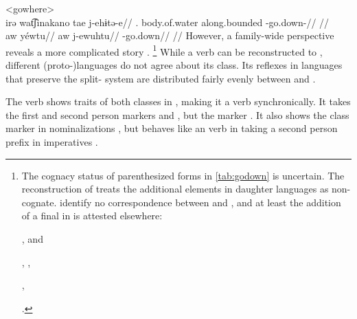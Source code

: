\pex<gowhere>
 \carijo {}\\
\begingl
\gla irə wat͡ʃinakano tae j-ehɨtə-e//
\glb {}. body.of.water along.bounded -go.down-//
\glft {}//
\endgl
{} \yukpa \parencite[][]{meira2003primeras}\\
\begingl
\glpreamble aw yéwtu//
\gla aw j-ewuhtu//
\glb {} -go.down//
\glft {}//
\endgl
\xe
%
However, a family-wide perspective reveals a more complicated story .%
\footnote{
The cognacy status of parenthesized forms in \cref{tab:godown} is uncertain.
The reconstruction of \PPek {} treats the additional elements in daughter languages as non-cognate.
\textcite{meira2005southern} identify no correspondence between \bakairi {} and \ikpeng {}, and at least the addition of a final  in \PXin is attested elsewhere:
		\begin{inlinelist}
			\item \PC {} , \arara and \ikpeng {} %
			\item \PC {} , \arara {}, \ikpeng {} %
			\item \PC {} , \arara {}  %
		\end{inlinelist} \parencites[8]{gildea2007greenberg}[56, 144, 57]{alves2017arara}[25, 270]{ikpengpacheco2001}.}
While a verb  can be reconstructed to \PC, different (proto-)languages do not agree about its class.
Its reflexes in languages that preserve the split- system are distributed fairly evenly between  and .



The verb shows traits of both classes in \wayana, making it a  verb synchronically.
It takes the first and second person  markers  and  \parencite[200]{wayanatavares2005}, but the  marker  \parencite[206]{wayanatavares2005}.
It also shows the  class marker  in nominalizations , but behaves like an  verb in taking a second person prefix in imperatives .

